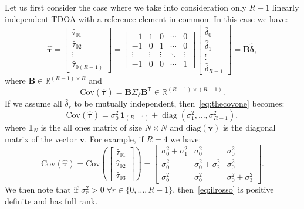 \noindent
Let us first consider the case where we take into consideration only \(R-1\) linearly independent TDOA with a reference element in common. In this case we have:
\begin{equation}
\boldsymbol{\hat{\tau}}=
\left[\begin{array}{c}
\hat{\tau}_{01} \\
\hat{\tau}_{02} \\
\vdots \\
\hat{\tau}_{0(R-1)}
\end{array}\right]
=\left[\begin{array}{ccccc}
-1 & 1 & 0 & \cdots & 0 \\
-1 & 0 & 1 & \cdots & 0 \\
\vdots & \vdots & \vdots & \ddots & \vdots \\
-1 & 0 & 0 & \cdots & 1
\end{array}\right] 
\left[\begin{array}{c}
\hat{\delta}_{0}\\
\hat{\delta}_{1}\\
\vdots \\
\hat{\delta}_{R-1}
\end{array}\right]
= \mathbf{B}\hat{\boldsymbol{\delta}},
\end{equation}
where \(\mathbf{B}\in\mathbb{R}^{(R-1)\times R}\) and
\begin{equation}
\text{Cov}(\boldsymbol{\hat{\tau}})=\mathbf{B}\Sigma_\delta\mathbf{B}^\mathsf{T}\in\mathbb{R}^{(R-1)\times (R-1)}.
\label{eq:thecovone}
\end{equation}
If we assume all \(\hat{\delta}_{r}\) to be mutually independent, then~\eqref{eq:thecovone} becomes:
\begin{equation}
\text{Cov}(\boldsymbol{\hat{\tau}})=\sigma_0^2 \,\mathbf{1}_{(R-1)}+\operatorname{diag}\left(\sigma_1^2, \ldots, \sigma_{R-1}^2\right),
\end{equation}
where \(\mathbf{1}_{N}\) is the all ones matrix of size \(N\times N\) and \(\text{diag}(\mathbf{v})\) is the diagonal matrix of the vector \(\mathbf{v}\).
For example, if \(R=4\) we have:
\begin{equation}
\text{Cov}\left(\boldsymbol{\hat{\tau}}\right)
=\text{Cov}\left(\left[\begin{array}{c}
\hat{\tau}_{01} \\
\hat{\tau}_{02} \\
\hat{\tau}_{03}
\end{array}\right]\right)
=
\left[\begin{array}{ccc}
\sigma_0^2+\sigma_1^2 & \sigma_0^2 & \sigma_0^2 \\
\sigma_0^2 & \sigma_0^2+\sigma_2^2 & \sigma_0^2 \\
\sigma_0^2 & \sigma_0^2 & \sigma_0^2+\sigma_3^2
\end{array}\right].
\label{eq:ilrosso}
\end{equation}
We then note that if \(\sigma_r^2> 0 \; \forall r\in\{0,\ldots,R-1\}\), then~\eqref{eq:ilrosso} is positive definite and has full rank.

